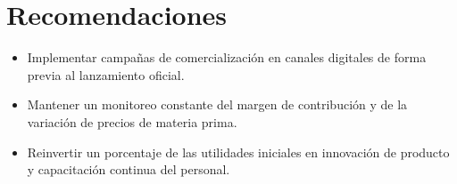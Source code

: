 \section*{Recomendaciones}

\begin{itemize}
    \item Implementar campañas de comercialización en canales digitales de forma previa al lanzamiento oficial.
    \item Mantener un monitoreo constante del margen de contribución y de la variación de precios de materia prima.
    \item Reinvertir un porcentaje de las utilidades iniciales en innovación de producto y capacitación continua del personal.
\end{itemize}
